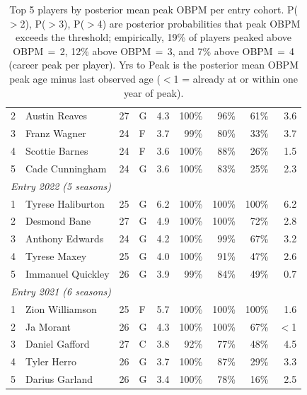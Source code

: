 \begin{table}[htbp]
\begin{tabular}{rlrlrrrrr}
    2 & Austin Reaves & 27 & G & 4.3 & 100\% & 96\% & 61\% & 3.6 \\
    3 & Franz Wagner & 24 & F & 3.7 & 99\% & 80\% & 33\% & 3.7 \\
    4 & Scottie Barnes & 24 & F & 3.6 & 100\% & 88\% & 26\% & 1.5 \\
    5 & Cade Cunningham & 24 & G & 3.6 & 100\% & 83\% & 25\% & 2.3 \\
    \midrule[0.4pt]
    \multicolumn{9}{l}{\textit{Entry 2022 (5 seasons)}} \\
    \midrule
    1 & Tyrese Haliburton & 25 & G & 6.2 & 100\% & 100\% & 100\% & 6.2 \\
    2 & Desmond Bane & 27 & G & 4.9 & 100\% & 100\% & 72\% & 2.8 \\
    3 & Anthony Edwards & 24 & G & 4.2 & 100\% & 99\% & 67\% & 3.2 \\
    4 & Tyrese Maxey & 25 & G & 4.0 & 100\% & 91\% & 47\% & 2.6 \\
    5 & Immanuel Quickley & 26 & G & 3.9 & 99\% & 84\% & 49\% & 0.7 \\
    \midrule[0.4pt]
    \multicolumn{9}{l}{\textit{Entry 2021 (6 seasons)}} \\
    \midrule
    1 & Zion Williamson & 25 & F & 5.7 & 100\% & 100\% & 100\% & 1.6 \\
    2 & Ja Morant & 26 & G & 4.3 & 100\% & 100\% & 67\% & $<$1 \\
    3 & Daniel Gafford & 27 & C & 3.8 & 92\% & 77\% & 48\% & 4.5 \\
    4 & Tyler Herro & 26 & G & 3.7 & 100\% & 87\% & 29\% & 3.3 \\
    5 & Darius Garland & 26 & G & 3.4 & 100\% & 78\% & 16\% & 2.5 \\
    \bottomrule
  \end{tabular}
  \caption{Top 5 players by posterior mean peak OBPM per entry cohort. P($>$2), P($>$3), P($>$4) are posterior probabilities that peak OBPM exceeds the threshold; empirically, 19\% of players peaked above OBPM\,$=$\,2, 12\% above OBPM\,$=$\,3, and 7\% above OBPM\,$=$\,4 (career peak per player). Yrs to Peak is the posterior mean OBPM peak age minus last observed age ($<$1 = already at or within one year of peak).}
  \label{tab:breakout_cohort}
\end{table}

